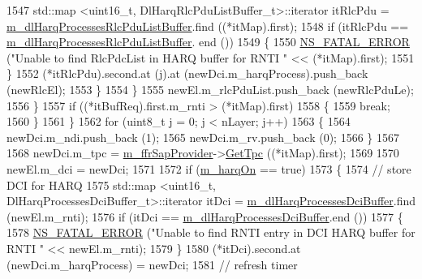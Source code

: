 \begin{DoxyCode}
1547                       std::map <uint16\_t, DlHarqRlcPduListBuffer\_t>::iterator itRlcPdu =  
      \hyperlink{classns3_1_1FdTbfqFfMacScheduler_ac885f8c49550f861905b5e790e346d7b}{m\_dlHarqProcessesRlcPduListBuffer}.find ((*itMap).first);
1548                       \textcolor{keywordflow}{if} (itRlcPdu == \hyperlink{classns3_1_1FdTbfqFfMacScheduler_ac885f8c49550f861905b5e790e346d7b}{m\_dlHarqProcessesRlcPduListBuffer}.
      end ())
1549                         \{
1550                           \hyperlink{group__fatal_ga5131d5e3f75d7d4cbfd706ac456fdc85}{NS\_FATAL\_ERROR} (\textcolor{stringliteral}{"Unable to find RlcPdcList in HARQ buffer for RNTI 
      "} << (*itMap).first);
1551                         \}
1552                       (*itRlcPdu).second.at (j).at (newDci.m\_harqProcess).push\_back (newRlcEl);
1553                     \}
1554                 \}
1555               newEl.m\_rlcPduList.push\_back (newRlcPduLe);
1556             \}
1557           \textcolor{keywordflow}{if} ((*itBufReq).first.m\_rnti > (*itMap).first)
1558             \{
1559               \textcolor{keywordflow}{break};
1560             \}
1561         \}
1562       \textcolor{keywordflow}{for} (uint8\_t j = 0; j < nLayer; j++)
1563         \{
1564           newDci.m\_ndi.push\_back (1);
1565           newDci.m\_rv.push\_back (0);
1566         \}
1567 
1568       newDci.m\_tpc = \hyperlink{classns3_1_1FdTbfqFfMacScheduler_a15bcdfbb46c65cae0d42e26b321f7827}{m\_ffrSapProvider}->\hyperlink{classns3_1_1LteFfrSapProvider_a0021d72c12fdaddd3817ef0eb5a7cd4e}{GetTpc} ((*itMap).first);
1569 
1570       newEl.m\_dci = newDci;
1571 
1572       \textcolor{keywordflow}{if} (\hyperlink{classns3_1_1FdTbfqFfMacScheduler_afb4bf57d3b17b967f82a5b2134cd70e7}{m\_harqOn} == \textcolor{keyword}{true})
1573         \{
1574           \textcolor{comment}{// store DCI for HARQ}
1575           std::map <uint16\_t, DlHarqProcessesDciBuffer\_t>::iterator itDci = 
      \hyperlink{classns3_1_1FdTbfqFfMacScheduler_a3b740ad89004ff0fce4d87eea57508e5}{m\_dlHarqProcessesDciBuffer}.find (newEl.m\_rnti);
1576           \textcolor{keywordflow}{if} (itDci == \hyperlink{classns3_1_1FdTbfqFfMacScheduler_a3b740ad89004ff0fce4d87eea57508e5}{m\_dlHarqProcessesDciBuffer}.end ())
1577             \{
1578               \hyperlink{group__fatal_ga5131d5e3f75d7d4cbfd706ac456fdc85}{NS\_FATAL\_ERROR} (\textcolor{stringliteral}{"Unable to find RNTI entry in DCI HARQ buffer for RNTI "} << 
      newEl.m\_rnti);
1579             \}
1580           (*itDci).second.at (newDci.m\_harqProcess) = newDci;
1581           \textcolor{comment}{// refresh timer}

\end{DoxyCode}
